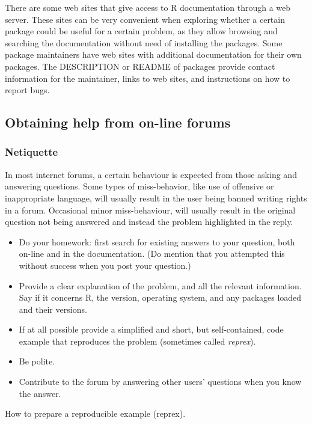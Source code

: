 \documentclass[krantz2,ChapterTOCs]{krantz}\usepackage{knitr}
\begin{document}
There are some web sites that give access to R documentation through a web server. These sites can be very convenient when exploring whether a certain package could be useful for a certain problem, as they allow browsing and searching the documentation without need of installing the packages. Some package maintainers have web sites with additional documentation for their own packages. The DESCRIPTION or README of packages provide contact information for the maintainer, links to web sites, and instructions on how to report bugs.

\subsection{Obtaining help from on-line forums}

\subsubsection{Netiquette}
In most internet forums, a certain behaviour is expected from those asking and answering questions. Some types of miss-behavior, like use of offensive or inappropriate language, will usually result in the user being banned writing rights in a forum. Occasional minor miss-behaviour, will usually result in the original question not being answered and instead the problem highlighted in the reply.

\begin{itemize}
  \item Do your homework: first search for existing answers to your question, both on-line and in the documentation. (Do mention that you attempted this without success when you post your question.)
  \item Provide a clear explanation of the problem, and all the relevant information. Say if it concerns R, the version, operating system, and any packages loaded and their versions.
  \item If at all possible provide a simplified and short, but self-contained, code example that reproduces the problem (sometimes called \emph{reprex}).
  \item Be polite.
  \item Contribute to the forum by answering other users' questions when you know the answer.
\end{itemize}

\begin{explainbox}
 How to prepare a reproducible example (reprex).
\end{explainbox}
\end{document}
